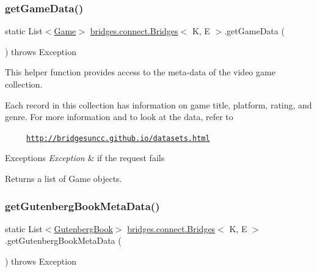 \subsubsection{\texorpdfstring{get\+Game\+Data()}{getGameData()}}
{\footnotesize\ttfamily static List$<$\hyperlink{classbridges_1_1data__src__dependent_1_1_game}{Game}$>$ \hyperlink{classbridges_1_1connect_1_1_bridges}{bridges.\+connect.\+Bridges}$<$ K, E $>$.get\+Game\+Data (\begin{DoxyParamCaption}{ }\end{DoxyParamCaption}) throws Exception\hspace{0.3cm}{\ttfamily [static]}}

This helper function provides access to the meta-\/data of the video game collection.

Each record in this collection has information on game title, platform, rating, and genre. For more information and to look at the data, refer to 

~~~~~\href{http://bridgesuncc.github.io/datasets.html}{\tt http\+://bridgesuncc.\+github.\+io/datasets.\+html} 


\begin{DoxyExceptions}{Exceptions}
{\em Exception} & if the request fails\\
\hline
\end{DoxyExceptions}
\begin{DoxyReturn}{Returns}
a list of Game objects. 
\end{DoxyReturn}
\hypertarget{classbridges_1_1connect_1_1_bridges_a123d445316be7e9927b5642a3b8c71ba}{}\label{classbridges_1_1connect_1_1_bridges_a123d445316be7e9927b5642a3b8c71ba} 
\subsubsection{\texorpdfstring{get\+Gutenberg\+Book\+Meta\+Data()}{getGutenbergBookMetaData()}}
{\footnotesize\ttfamily static List$<$\hyperlink{classbridges_1_1data__src__dependent_1_1_gutenberg_book}{Gutenberg\+Book}$>$ \hyperlink{classbridges_1_1connect_1_1_bridges}{bridges.\+connect.\+Bridges}$<$ K, E $>$.get\+Gutenberg\+Book\+Meta\+Data (\begin{DoxyParamCaption}{ }\end{DoxyParamCaption}) throws Exception\hspace{0.3cm}{\ttfamily [static]}}

